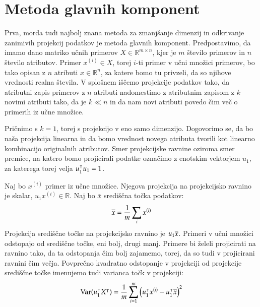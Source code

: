 \begin{figure}[htbp]
\end{figure}

\section{Metoda glavnih komponent}

Prva, morda tudi najbolj znana metoda za zmanjšanje dimenzij in odkrivanje zanimivih projekcij podatkov je metoda glavnih komponent. Predpostavimo, da imamo dano matriko učnih primerov $X\in\mathbb{R}^{m\times n}$, kjer je $m$ število primerov in $n$ število atributov. Primer $x^{(i)}\in X$, torej $i$-ti primer v učni množici primerov, bo tako opisan z $n$ atributi $x\in\mathbb{R}^{n}$, za katere bomo tu privzeli, da so njihove vrednosti realna števila. V splošnem iščemo projekcije podatkov tako, da atributni zapis primerov z $n$ atributi nadomestimo z atributnim zapisom z $k$ novimi atributi tako, da je $k\ll n$ in da nam novi atributi povedo čim več o primerih iz učne množice.

Pričnimo s $k=1$, torej s projekcijo v eno samo dimenzijo. Dogovorimo se, da bo naša projekcija linearna in da bomo vrednost novega atributa tvorili kot linearno kombinacijo originalnih atributov. Smer projekcijske ravnine oziroma smer premice, na katero bomo projicirali podatke označimo z enotskim vektorjem $u_1$, za katerega torej velja $u_1^\intercal u_1=1$.

Naj bo $x^{(i)}$ primer iz učne množice. Njegova projekcija na projekcijsko ravnino je skalar, $u_1 x^{(i)}\in \mathbb{R}$. Naj bo $\bar{x}$ središčna točka podatkov:
%
$$ \overline{x}=\frac{1}{m}\sum_i x^{(i)}$$
%
Projekcija središčne točke na projekcijsko ravnino je $u_1 \overline{x}$. Primeri v učni množici odstopajo od središčne točke, eni bolj, drugi manj. Primere bi želeli projicirati na ravnino tako, da ta odstopanja čim bolj zajamemo, torej, da so tudi v projicirani ravnini čim večja. Povprečno kvadratno odstopanje v projekciji od projekcije središčne točke imenujemo tudi varianca točk v projekciji:
%
$$ \mathrm{Var}(u_1^\intercal X^\intercal)=\frac{1}{m}\sum_{i=1}^m \big(u_1^\intercal x^{(i)}-u_1^\intercal\overline{x}\big)^2 $$

